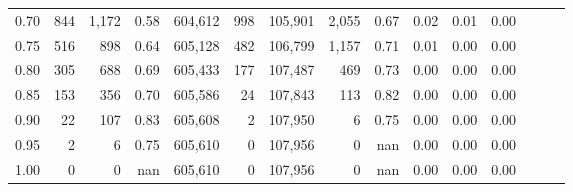 \begin{tabular}{rrrrrrrrrrrrrrr}
0.70 &      844 &   1,172 &  0.58 &  604,612 &      998 &  105,901 &    2,055 &  0.67 &  0.02 &  0.01 &      0.00 \\
0.75 &      516 &     898 &  0.64 &  605,128 &      482 &  106,799 &    1,157 &  0.71 &  0.01 &  0.00 &      0.00 \\
0.80 &      305 &     688 &  0.69 &  605,433 &      177 &  107,487 &      469 &  0.73 &  0.00 &  0.00 &      0.00 \\
0.85 &      153 &     356 &  0.70 &  605,586 &       24 &  107,843 &      113 &  0.82 &  0.00 &  0.00 &      0.00 \\
0.90 &       22 &     107 &  0.83 &  605,608 &        2 &  107,950 &        6 &  0.75 &  0.00 &  0.00 &      0.00 \\
0.95 &        2 &       6 &  0.75 &  605,610 &        0 &  107,956 &        0 &   nan &  0.00 &  0.00 &      0.00 \\
1.00 &        0 &       0 &   nan &  605,610 &        0 &  107,956 &        0 &   nan &  0.00 &  0.00 &      0.00 \\
\bottomrule
\end{tabular}
